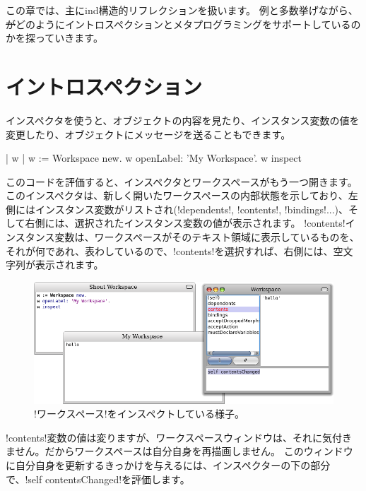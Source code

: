 \documentclass[a4paper,10pt,twoside]{book}
\begin{document}
この章では、主にind{構造的リフレクション}を扱います。
例と多数挙げながら、 \st がどのようにイントロスペクションとメタプログラミングをサポートしているのかを探っていきます。

\section{イントロスペクション}

インスペクタを使うと、オブジェクトの内容を見たり、インスタンス変数の値を変更したり、オブジェクトにメッセージを送ることもできます。

\begin{code}{| w |}
w := Workspace new.
w openLabel: 'My Workspace'.
w inspect
\end{code}

このコードを評価すると、インスペクタとワークスペースがもう一つ開きます。
このインスペクタは、新しく開いたワークスペースの内部状態を示しており、左側にはインスタンス変数がリストされ(\ct!dependents!, \ct!contents!, \ct!bindings!...)、そして右側には、選択されたインスタンス変数の値が表示されます。
\ct!contents!インスタンス変数は、ワークスペースがそのテキスト領域に表示しているものを、それが何であれ、表わしているので、\ct!contents!を選択すれば、右側には、空文字列が表示されます。

\begin{figure}[ht]\centering
	\includegraphics[width=\linewidth]{workspaceInspector}
	\caption{\lct!ワークスペース!をインスペクトしている様子。}
\end{figure}

\ct!contents!変数の値は変りますが、ワークスペースウィンドウは、それに気付きません。だからワークスペースは自分自身を再描画しません。
このウィンドウに自分自身を更新するきっかけを与えるには、インスペクターの下の部分で、\ct!self contentsChanged!を評価します。
\end{document}
